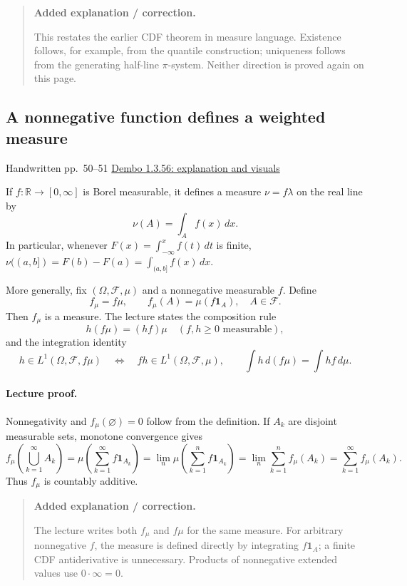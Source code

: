 \documentclass[11pt,letterpaper]{article}
\newcommand{\lecturesection}[1]{\subsection{#1}}
\begin{document}
\begin{quote}\small\textbf{Added explanation / correction.}

This restates the earlier CDF theorem in measure language. Existence follows, for example, from the quantile construction; uniqueness follows from the generating half-line $\pi$-system. Neither direction is proved again on this page.
\end{quote}

\hypertarget{l6-s6}{}
\lecturesection{A nonnegative function defines a weighted measure}
{\small\textcolor{lectureink}{Handwritten pp.\ 50--51} \quad \href{https://josephrbailey.com/probability/\#entry-1-3-56}{Dembo 1.3.56: explanation and visuals}}

If $f:\mathbb R\to[0,\infty]$ is Borel measurable, it defines a measure $\nu=f\lambda$ on the real line by \[\nu(A)=\int_A f(x)\,dx.\] In particular, whenever $F(x)=\int_{-\infty}^{x}f(t)\,dt$ is finite, $\nu((a,b])=F(b)-F(a)=\int_{(a,b]}f(x)\,dx$.

More generally, fix $(\Omega,\mathcal F,\mu)$ and a nonnegative measurable $f$. Define \[f_\mu=f\mu,\qquad f_\mu(A)=\mu(f\mathbf1_A),\quad A\in\mathcal F.\] Then $f_\mu$ is a measure. The lecture states the composition rule \[h(f\mu)=(hf)\mu\quad(f,h\ge0\text{ measurable}),\] and the integration identity \[h\in L^1(\Omega,\mathcal F,f\mu)\quad\Longleftrightarrow\quad fh\in L^1(\Omega,\mathcal F,\mu),\qquad \int h\,d(f\mu)=\int hf\,d\mu.\]

\paragraph{Lecture proof.}
Nonnegativity and $f_\mu(\varnothing)=0$ follow from the definition. If $A_k$ are disjoint measurable sets, monotone convergence gives \[f_\mu\left(\bigcup_{k=1}^{\infty}A_k\right)=\mu\left(\sum_{k=1}^{\infty}f\mathbf1_{A_k}\right)=\lim_n\mu\left(\sum_{k=1}^{n}f\mathbf1_{A_k}\right)=\lim_n\sum_{k=1}^{n}f_\mu(A_k)=\sum_{k=1}^{\infty}f_\mu(A_k).\] Thus $f_\mu$ is countably additive.

\begin{quote}\small\textbf{Added explanation / correction.}

The lecture writes both $f_\mu$ and $f\mu$ for the same measure. For arbitrary nonnegative $f$, the measure is defined directly by integrating $f\mathbf1_A$; a finite CDF antiderivative is unnecessary. Products of nonnegative extended values use $0\cdot\infty=0$.
\end{quote}
\end{document}
